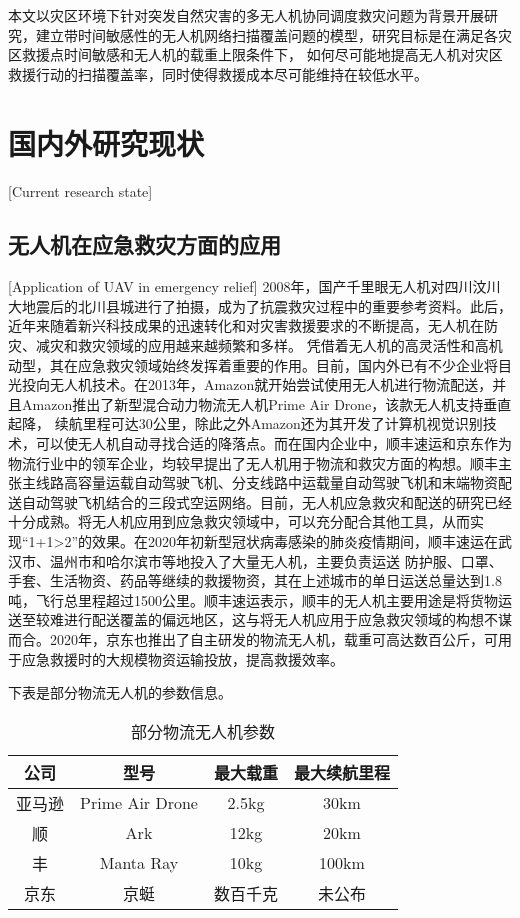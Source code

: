 本文以灾区环境下针对突发自然灾害的多无人机协同调度救灾问题为背景开展研究，建立带时间敏感性的无人机网络扫描覆盖问题的模型，研究目标是在满足各灾区救援点时间敏感和无人机的载重上限条件下，
如何尽可能地提高无人机对灾区救援行动的扫描覆盖率，同时使得救援成本尽可能维持在较低水平。


\section{国内外研究现状}[Current research state]

\subsection{无人机在应急救灾方面的应用}[Application of UAV in emergency relief]
2008年，国产千里眼无人机对四川汶川大地震后的北川县城进行了拍摄，成为了抗震救灾过程中的重要参考资料。此后，近年来随着新兴科技成果的迅速转化和对灾害救援要求的不断提高，无人机在防灾、减灾和救灾领域的应用越来越频繁和多样。
凭借着无人机的高灵活性和高机动型，其在应急救灾领域始终发挥着重要的作用。目前，国内外已有不少企业将目光投向无人机技术。在2013年，Amazon就开始尝试使用无人机进行物流配送，并且Amazon推出了新型混合动力物流无人机Prime Air Drone，该款无人机支持垂直起降，
续航里程可达30公里，除此之外Amazon还为其开发了计算机视觉识别技术，可以使无人机自动寻找合适的降落点。\cite{zhanghonghai}而在国内企业中，顺丰速运和京东作为物流行业中的领军企业，均较早提出了无人机用于物流和救灾方面的构想。顺丰主张主线路高容量运载自动驾驶飞机、分支线路中运载量自动驾驶飞机和末端物资配送自动驾驶飞机结合的三段式空运网络。目前，无人机应急救灾和配送的研究已经十分成熟。将无人机应用到应急救灾领域中，可以充分配合其他工具，从而实现“1+1>2”的效果。在2020年初新型冠状病毒感染的肺炎疫情期间，顺丰速运在武汉市、温州市和哈尔滨市等地投入了大量无人机，主要负责运送
防护服、口罩、手套、生活物资、药品等继续的救援物资，其在上述城市的单日运送总量达到1.8吨，飞行总里程超过1500公里。顺丰速运表示，顺丰的无人机主要用途是将货物运送至较难进行配送覆盖的偏远地区，这与将无人机应用于应急救灾领域的构想不谋而合。2020年，京东也推出了自主研发的物流无人机，载重可高达数百公斤，可用于应急救援时的大规模物资运输投放，提高救援效率。\cite{renxuan}


下表是部分物流无人机的参数信息。
\begin{table}[h]
  \begin{center}
  \caption{部分物流无人机参数} 
  \begin{tabular}{c|c|c|c}
  \hline
  \hline
  公司 & 型号 & 最大载重 & 最大续航里程 \\
  \hline
  \hline
  亚马逊 & Prime Air Drone & 2.5kg & 30km \\
  \hline
  顺 & Ark & 12kg & 20km \\
  丰 & Manta Ray & 10kg & 100km \\
  \hline
  京东 & 京蜓 & 数百千克 & 未公布 \\ 
  \hline
  \end{tabular}
  \end{center}
  \end{table}

